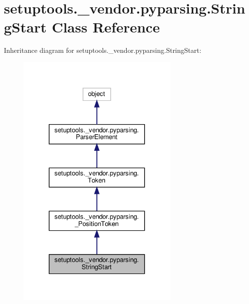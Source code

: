 \hypertarget{classsetuptools_1_1__vendor_1_1pyparsing_1_1StringStart}{}\section{setuptools.\+\_\+vendor.\+pyparsing.\+String\+Start Class Reference}
\label{classsetuptools_1_1__vendor_1_1pyparsing_1_1StringStart}


Inheritance diagram for setuptools.\+\_\+vendor.\+pyparsing.\+String\+Start\+:
\nopagebreak
\begin{figure}[H]
\begin{center}
\leavevmode
\includegraphics[width=227pt]{classsetuptools_1_1__vendor_1_1pyparsing_1_1StringStart__inherit__graph}
\end{center}
\end{figure}


